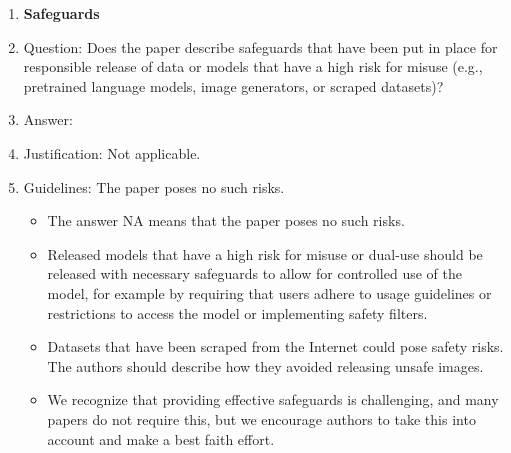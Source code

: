 \documentclass{article}
\theoremstyle{plain}
\theoremstyle{definition}
\theoremstyle{remark}
\begin{document}
\begin{enumerate}
\item {\bf Safeguards}
    \item[] Question: Does the paper describe safeguards that have been put in place for responsible release of data or models that have a high risk for misuse (e.g., pretrained language models, image generators, or scraped datasets)?
    \item[] Answer: \answerNA{} %
    \item[] Justification: Not applicable. 
    \item[] Guidelines: The paper poses no such risks.
    \begin{itemize}
        \item The answer NA means that the paper poses no such risks.
        \item Released models that have a high risk for misuse or dual-use should be released with necessary safeguards to allow for controlled use of the model, for example by requiring that users adhere to usage guidelines or restrictions to access the model or implementing safety filters. 
        \item Datasets that have been scraped from the Internet could pose safety risks. The authors should describe how they avoided releasing unsafe images.
        \item We recognize that providing effective safeguards is challenging, and many papers do not require this, but we encourage authors to take this into account and make a best faith effort.
    \end{itemize}


\end{enumerate}
\end{document}
